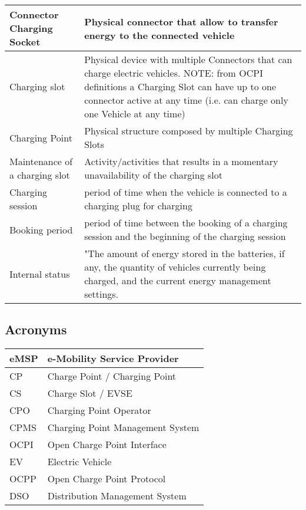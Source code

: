 \documentclass[12pt]{article}
\begin{document}
\begin{tabular}{|p{5cm}|p{10cm}|}
	\hline
	Connector \newline Charging Socket & Physical connector that allow to transfer energy to the connected vehicle\\
	\hline
	Charging slot & Physical device with multiple Connectors that can charge electric vehicles.\newline
	NOTE: from OCPI definitions a Charging Slot can have up to one connector active at any time (i.e. can charge only one Vehicle at any time) \\
	\hline
	Charging Point & Physical structure composed by multiple Charging Slots\\
	\hline
	Maintenance of a charging slot & Activity/activities that results in a momentary unavailability of the charging slot\\
	\hline
	Charging session & period of time when the vehicle is connected to a charging plug for charging\\
	\hline
	Booking period & period of time between the booking of a charging session and the beginning of the charging session\\
	\hline
	Internal status & "The amount of energy stored in the batteries, if any, the quantity of vehicles currently being charged, and the current energy management settings. \\
	\hline
	
	
\end{tabular}

\subsection{Acronyms}
\begin{tabular}{|l|l|}
	\hline
	eMSP & e-Mobility Service Provider\\
	\hline
	CP & Charge Point / Charging Point\\
	\hline
	CS & Charge Slot / EVSE\\
	\hline
	CPO & Charging Point Operator\\
	\hline
	CPMS & Charging Point Management System\\
	\hline
	OCPI & Open Charge Point Interface\\
	\hline
	EV & Electric Vehicle\\
	\hline
	OCPP & Open Charge Point Protocol\\
	\hline
	DSO & Distribution Management System \\
	\hline
\end{tabular}
\end{document}

